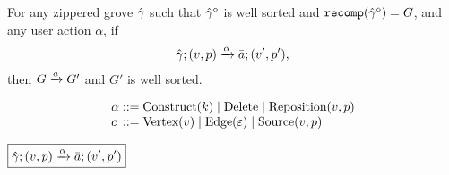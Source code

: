 \begin{theorem}[Sensibility]
  For any zippered grove $\Z{\Grove}$
  such that $\erase{\Z{\Grove}}$ is well sorted
    and $\recomp{\erase{\Z{\Grove}}} = G$,
  and any user action $\alpha$,
  if
  \[
    \applyAction{\Z{\Grove}}{v}{p}{\alpha}{\Q{a}}{v'}{p'},
  \]
  then $G \action{\Q{a}} G'$ and $G'$ is well sorted.
\end{theorem}

\[
  \arraycolsep=0pt
  \begin{array}{llll}
    \alpha & {}::={} &
      \Construct{k}
      \mid \Delete
      \mid \Reposition{v}{p}
    \\
    c & {}::={} &
      \CVertex{v}
      \mid \CEdge{\e}
      \mid \CSource{v}{p}
    \\
  \end{array}
\]

\noindent $\boxed{\applyAction{ \Z{\Grove} }{ v }{ p }{ \alpha }{ \Q{a} }{ v' }{ p' }}$
%
\begin{mathpar}


\end{mathpar}

